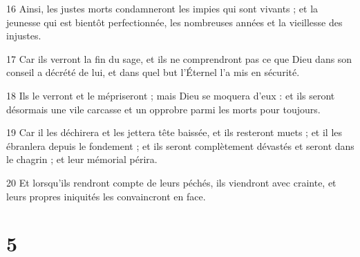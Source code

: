 \par 16 Ainsi, les justes morts condamneront les impies qui sont vivants ; et la jeunesse qui est bientôt perfectionnée, les nombreuses années et la vieillesse des injustes.
\par 17 Car ils verront la fin du sage, et ils ne comprendront pas ce que Dieu dans son conseil a décrété de lui, et dans quel but l'Éternel l'a mis en sécurité.
\par 18 Ils le verront et le mépriseront ; mais Dieu se moquera d'eux : et ils seront désormais une vile carcasse et un opprobre parmi les morts pour toujours.
\par 19 Car il les déchirera et les jettera tête baissée, et ils resteront muets ; et il les ébranlera depuis le fondement ; et ils seront complètement dévastés et seront dans le chagrin ; et leur mémorial périra.
\par 20 Et lorsqu'ils rendront compte de leurs péchés, ils viendront avec crainte, et leurs propres iniquités les convaincront en face.

\chapter{5}

